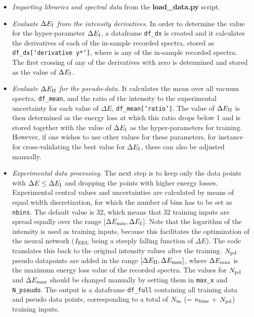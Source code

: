 \begin{itemize}
  
\item {\it Importing libraries and spectral data} from the {\bf load\_data.py} script.

\item {\it Evaluate  $\Delta E_{\rm I}$ from the intensity derivatives}.
  In order to determine the value for the hyper-parameter
  $\Delta E_{\rm I}$, a dataframe {\tt df\_dx} is created
and it calculates the derivatives of each of the in-sample recorded spectra, 
stored as {\tt df\_dx['derivative y*']}, where {\tt *} is any of the in-sample recorded spectra.
%
The first crossing of any of the derivatives with zero is determined 
and stored as the value of $\Delta E_{\rm I}$. 

\item {\it Evaluate $\Delta E_{\rm II}$ for the pseudo-data.}
It calculates the mean over all vacuum spectra, {\tt df\_mean}, and the ratio of the 
intensity to the experimental uncertainty for each value of
$\Delta E$, {\tt df\_mean['ratio']}. 
%
The value of $\Delta E_{\rm II}$ is then determined as the energy loss at which this ratio
drops below 1 and  is stored together with the value of $\Delta E_{\rm I}$
as the hyper-parameters for training. 
%
However, if one wishes to use other values for these parameters, for instance for 
cross-validating the best value for $\Delta E_{\rm I}$, these can also be adjusted manually.

\item {\it Experimental data processing.}
%
  The next step is to keep only
  the data points with $\Delta E \le \Delta E_{\rm I}$  
and dropping the points with higher energy losses.
%
Experimental central values and uncertainties are calculated by means of equal width 
discretization, for which the number of bins has to be set as {\tt nbins}. 
%
The default value is 32, which means that 32 training inputs are spread equally
over the range [$ \Delta E_{\rm min}, \Delta E_{\rm I}$]. 
%
Note that the logarithm of the intensity is used as training inputs, because this facilitates
the optimization of the neural network ($I_{\rm EEL}$ being a steeply falling function
of $\Delta E$).
%
The code translates this back to the original intensity values after the training.
%
$N_{\rm pd}$
pseudo datapoints are added in the range $[\Delta E_{\rm II}, \Delta E_{\rm max}]$, where
$ \Delta E_{\rm max}$
is the maximum energy loss value of the recorded spectra. 
%
The values for $N_{\rm pd}$ and $\Delta E_{\rm max}$ should be changed manually by 
setting them in {\tt max\_x} and {\tt N\_pseudo}. 
%
The output is a dataframe {\tt df\_full} containing all training data and pseudo data points, 
corresponding to a total of $N_{\rm in}$ (= $n_{\rm bins}$ + $N_{\rm pd}$) training inputs.


\end{itemize}
